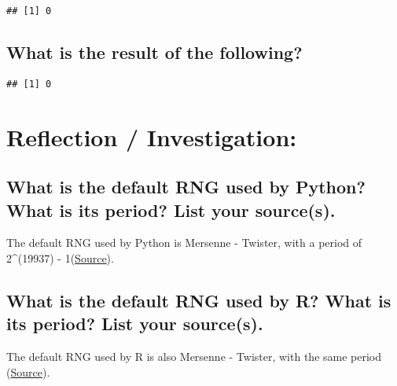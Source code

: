 \documentclass[
]{article}
\newenvironment{Shaded}{\begin{snugshade}}{\end{snugshade}}
\newcommand{\FunctionTok}[1]{\textcolor[rgb]{0.00,0.00,0.00}{#1}}
\newcommand{\NormalTok}[1]{#1}
\newcommand{\SpecialCharTok}[1]{\textcolor[rgb]{0.00,0.00,0.00}{#1}}
\begin{document}
\begin{verbatim}
## [1] 0
\end{verbatim}

\hypertarget{what-is-the-result-of-the-following-1}{%
\subsection{What is the result of the
following?}\label{what-is-the-result-of-the-following-1}}

\begin{Shaded}
\end{Shaded}

\begin{verbatim}
## [1] 0
\end{verbatim}

\hypertarget{reflection-investigation}{%
\section{Reflection / Investigation:}\label{reflection-investigation}}

\hypertarget{what-is-the-default-rng-used-by-python-what-is-its-period-list-your-sources.}{%
\subsection{What is the default RNG used by Python? What is its period?
List your
source(s).}\label{what-is-the-default-rng-used-by-python-what-is-its-period-list-your-sources.}}

The default RNG used by Python is Mersenne - Twister, with a period of
2\^{}(19937) - 1(\href{https://peps.python.org/pep-0504/}{Source}).

\hypertarget{what-is-the-default-rng-used-by-r-what-is-its-period-list-your-sources.}{%
\subsection{What is the default RNG used by R? What is its period? List
your
source(s).}\label{what-is-the-default-rng-used-by-r-what-is-its-period-list-your-sources.}}

The default RNG used by R is also Mersenne - Twister, with the same
period
(\href{https://consultglp.com/wp-content/uploads/2016/12/r-techniques-in-generating-random-numbers.pdf}{Source}).
\end{document}
